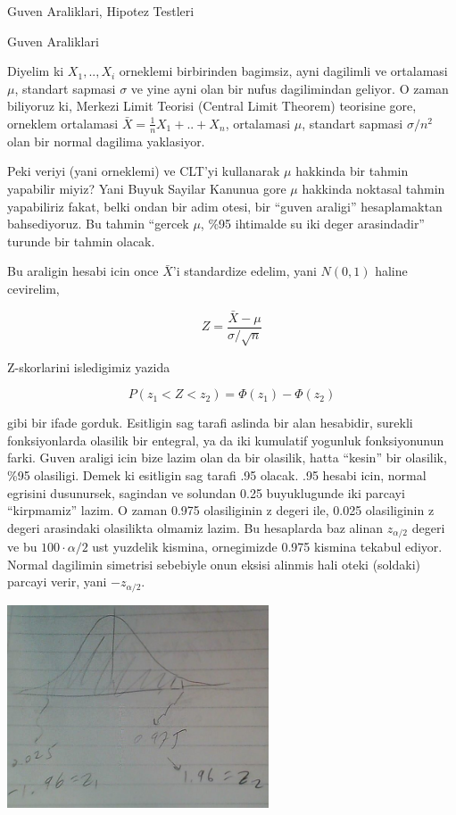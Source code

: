 \documentclass[12pt,fleqn]{article}\usepackage{../common}
\begin{document}
Guven Araliklari, Hipotez Testleri

Guven Araliklari

Diyelim ki $X_1,..,X_i$ orneklemi birbirinden bagimsiz, ayni dagilimli ve
ortalamasi $\mu$, standart sapmasi $\sigma$ ve yine ayni olan bir nufus
dagilimindan geliyor. O zaman biliyoruz ki, Merkezi Limit Teorisi (Central
Limit Theorem) teorisine gore, orneklem ortalamasi $\bar{X} = \frac{1}{n}
X_1+..+X_n$, ortalamasi $\mu$, standart sapmasi $\sigma/n^2$ olan bir
normal dagilima yaklasiyor.

Peki veriyi (yani orneklemi) ve CLT'yi kullanarak $\mu$ hakkinda bir tahmin
yapabilir miyiz? Yani Buyuk Sayilar Kanunua gore $\mu$ hakkinda noktasal
tahmin yapabiliriz fakat, belki ondan bir adim otesi, bir ``guven araligi''
hesaplamaktan bahsediyoruz. Bu tahmin ``gercek $\mu$, \%95 ihtimalde su iki deger
arasindadir'' turunde bir tahmin olacak.

Bu araligin hesabi icin once $\bar{X}$'i standardize edelim, yani $N(0,1)$ haline cevirelim,

$$ Z = \frac{\bar{X} - \mu}{\sigma / \sqrt{n}} $$

Z-skorlarini isledigimiz yazida 

$$
P(z_1 < Z < z_2) =  \Phi(z_1) - \Phi(z_2) 
$$

gibi bir ifade gorduk. Esitligin sag tarafi aslinda bir alan hesabidir,
surekli fonksiyonlarda olasilik bir entegral, ya da iki kumulatif yogunluk
fonksiyonunun farki. Guven araligi icin bize lazim olan da bir olasilik,
hatta ``kesin'' bir olasilik, \%95 olasiligi. Demek ki esitligin sag tarafi
.95 olacak. .95 hesabi icin, normal egrisini dusunursek, sagindan ve
solundan 0.25 buyuklugunde iki parcayi ``kirpmamiz'' lazim. O zaman 0.975
olasiliginin z degeri ile, 0.025 olasiliginin z degeri arasindaki
olasilikta olmamiz lazim. Bu hesaplarda baz alinan $z_{\alpha/2}$ degeri ve
bu $100 \cdot \alpha / 2$ ust yuzdelik kismina, ornegimizde 0.975 kismina
tekabul ediyor. Normal dagilimin simetrisi sebebiyle onun eksisi alinmis
hali oteki (soldaki) parcayi verir, yani $-z_{\alpha/2}$. 

\includegraphics[height=6cm]{norm95.jpg}
\end{document}
